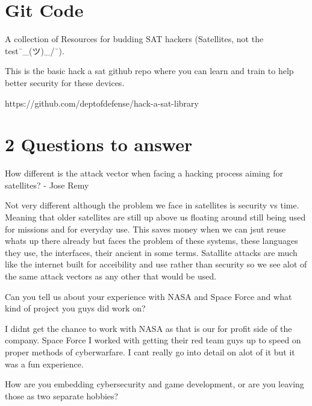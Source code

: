 \section{Git Code}
A collection of Resources for budding SAT hackers (Satellites, not the test¯\_(ツ)_/¯).

This is the basic hack a sat github repo where you can learn and train to help better security for these devices.

https://github.com/deptofdefense/hack-a-sat-library

\section{2 Questions to answer}
How different is the attack vector when facing a hacking process aiming for satellites? - Jose Remy

Not very different although the problem we face in satellites is security vs time. Meaning that older satellites are still up above us floating around still being used for missions and for everyday use. This saves money when we can jsut reuse whats up there already but faces the problem of these systems, these languages they use, the interfaces, their ancient in some terms. Satallite attacks are much like the internet built for acceibility and use rather than security so we see alot of the same attack vectors as any other that would be used.

Can you tell us about your experience with NASA and Space Force and what kind of project you guys did work on?

I didnt get the chance to work with NASA as that is our for profit side of the company. Space Force I worked with getting their red team guys up to speed on proper methods of cyberwarfare. I cant really go into detail on alot of it but it was a fun experience.

How are you embedding cybersecurity and game development, or are you leaving those as two separate hobbies?




%
